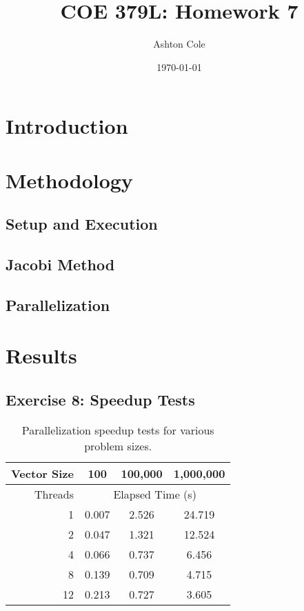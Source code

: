 \documentclass{article}
\title{COE 379L: Homework 7}
\author{Ashton Cole}
\date{\today}
\begin{document}
\maketitle

\section{Introduction}

\section{Methodology}

\subsection{Setup and Execution}

\subsection{Jacobi Method}

\subsection{Parallelization}

\section{Results}

\subsection{Exercise 8: Speedup Tests}

\begin{table}[h!]
	\centering
	\caption{Parallelization speedup tests for various problem sizes.}
	\label{tbl:speedup}
	\begin{tabular}{r|ccc}
		Vector Size & 100 & 100,000 & 1,000,000 \\
		\hline
		Threads & \multicolumn{3}{c}{Elapsed Time (s)} \\
		\hline
		1 & 0.007 & 2.526 & 24.719 \\
		2 & 0.047 & 1.321 & 12.524 \\
		4 & 0.066 & 0.737 & 6.456 \\
		8 & 0.139 & 0.709 & 4.715 \\
		12 & 0.213 & 0.727 & 3.605
	\end{tabular}
\end{table}
\end{document}
